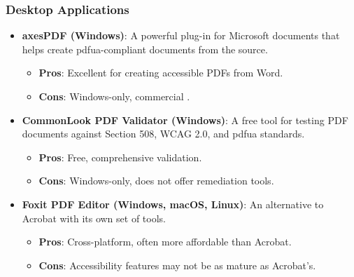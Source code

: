 \subsubsection{Desktop Applications}
\label{ssubsec:desktop-apps-pdf}
\begin{itemize}
	\item \textbf{axesPDF (Windows)}: A powerful plug-in for Microsoft documents that helps create \gls{pdfua}-compliant documents from the source.
	      \begin{itemize}
		      \item \textbf{Pros}: Excellent for creating accessible PDFs from Word.
		      \item \textbf{Cons}: Windows-only, commercial .
	      \end{itemize}
	\item \textbf{CommonLook PDF Validator (Windows)\supercite{AllyantValidator}}: A free tool for testing PDF documents against Section 508, WCAG 2.0, and \gls{pdfua} standards.
	      \begin{itemize}
		      \item \textbf{Pros}: Free, comprehensive validation.
		      \item \textbf{Cons}: Windows-only, does not offer remediation tools.
	      \end{itemize}
	\item \textbf{Foxit PDF Editor (Windows, macOS, Linux)}: An alternative to Acrobat with its own set of  tools.
	      \begin{itemize}
		      \item \textbf{Pros}: Cross-platform, often more affordable than Acrobat.
		      \item \textbf{Cons}: Accessibility features may not be as mature as Acrobat's.
	      \end{itemize}
\end{itemize}


